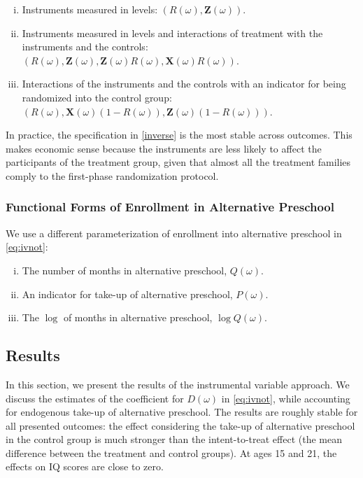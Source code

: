 \begin{appendices}
\begin{enumerate}[(i)]
\item Instruments measured in levels: $ \left( R(\omega),\mathbf{Z}(\omega) \right) $.
\item\label{interact} Instruments measured in levels and interactions of treatment with the instruments and the controls: $ \left(R(\omega),\mathbf{Z}(\omega),\mathbf{Z}(\omega)R(\omega),\mathbf{X}(\omega)R(\omega) \right)$.
\item\label{inverse} Interactions of the instruments and the controls with an indicator for being randomized into the control group: $\left( R(\omega), \mathbf{X}(\omega) \left( 1-R(\omega) \right), \mathbf{Z}(\omega) \left( 1-R(\omega) \right) \right)$.
\end{enumerate}

\noindent In practice, the specification in \eqref{inverse} is the most stable across outcomes. This makes economic sense because the instruments are less likely to affect the participants of the treatment group, given that almost all the treatment families comply to the first-phase randomization protocol.

\subsubsection{Functional Forms of Enrollment in Alternative Preschool}

\noindent We use a different parameterization of enrollment into alternative preschool in \eqref{eq:ivnot}:

\begin{enumerate}[(i)]
\item The number of months in alternative preschool, $Q(\omega)$.
\item An indicator for take-up of alternative preschool, $P(\omega)$.
\item The $\log$ of months in alternative preschool, $\log Q(\omega)$.
\end{enumerate}

\subsection{Results}

\noindent In this section, we present the results of the instrumental variable approach. We discuss the estimates of the coefficient for $D(\omega)$ in \eqref{eq:ivnot}, while accounting for endogenous take-up of alternative preschool. The results are roughly stable for all presented outcomes: the effect considering the take-up of alternative preschool in the control group is much stronger than the intent-to-treat effect (the mean difference between the treatment and control groups). At ages 15 and 21, the effects on IQ scores are close to zero.


\end{appendices}
